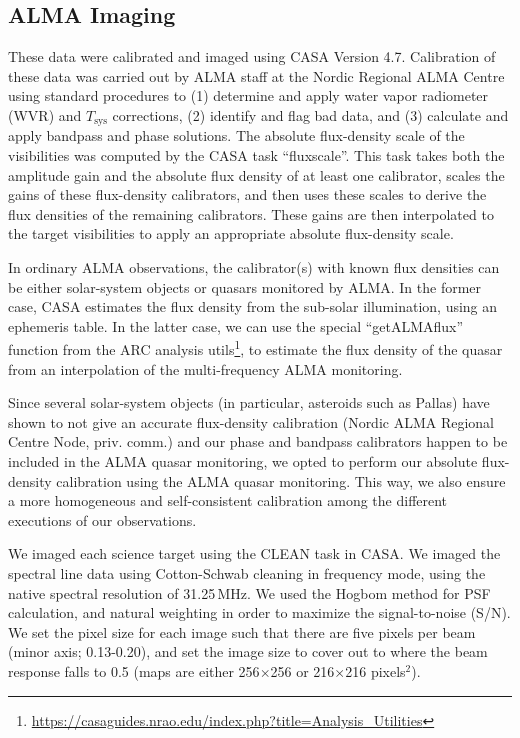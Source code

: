 \documentclass[a4paper,fleqn,usenatbib]{mnras}
\begin{document}
\subsection{ALMA Imaging}
\label{ssec:almaimage}

These data were calibrated and imaged using CASA Version 4.7. Calibration of these data was carried out by ALMA staff at the Nordic Regional ALMA Centre using standard procedures to (1) determine and apply water vapor radiometer (WVR) and $T_{\mathrm{sys}}$ corrections, (2) identify and flag bad data, and (3) calculate and apply bandpass and phase solutions.  The absolute flux-density scale of the visibilities was computed by the
CASA task ``fluxscale''.  This task takes both the amplitude gain and the absolute flux density of at least one calibrator, scales the gains of these flux-density calibrators, and then uses these scales to derive the flux densities of the remaining calibrators. These gains are then interpolated to the target visibilities to apply an appropriate absolute flux-density scale.

In ordinary ALMA observations, the calibrator(s) with known flux
densities can be either solar-system objects or quasars monitored by
ALMA. In the former case, CASA estimates the flux density from the
sub-solar illumination, using an ephemeris table. In the latter case, we
can use the special ``getALMAflux'' function from the ARC analysis
utils\footnote{\url{https://casaguides.nrao.edu/index.php?title=Analysis_Utilities}}, to estimate the flux density of the quasar from an interpolation of the
multi-frequency ALMA monitoring.

Since several solar-system objects (in particular, asteroids such as 
Pallas) have shown to not give an
accurate flux-density calibration (Nordic ALMA Regional Centre Node, priv. comm.) and our
phase and bandpass calibrators happen to be included in the ALMA quasar
monitoring, we opted to perform our absolute flux-density calibration
using the ALMA quasar monitoring. This way, we also ensure a more
homogeneous and self-consistent calibration among the different
executions of our observations.

We imaged each science target using the CLEAN task in CASA. We imaged the spectral line data using Cotton-Schwab cleaning in frequency mode, using the native spectral resolution of 31.25\,MHz. We used the Hogbom method for PSF calculation, and natural weighting in order to maximize the signal-to-noise (S/N). We set the pixel size for each image such that there are five pixels per beam (minor axis; 0.13-0.20\arcsec), and set the image size to cover out to where the beam response falls to 0.5 (maps are either 256$\times$256 or 216$\times$216 pixels$^2$).
\end{document}
